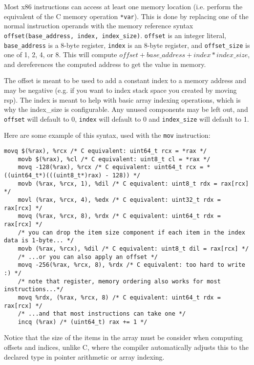 \documentclass[11pt]{article}
\begin{document}
Most x86 instructions can access at least one memory location (i.e. perform the equivalent
of the C memory operation \texttt{*var}). This is done by replacing one of the normal
instruction operands with the memory reference syntax \texttt{offset(base\_address,
index, index\_size)}. \texttt{offset} is an integer literal, \texttt{base\_address} is a
8-byte register, \texttt{index} is an 8-byte register, and \texttt{offset\_size} is one of
1, 2, 4, or 8. This will compute $offset + base\_address + index * index\_size$, and
dereferences the computed address to get the value in memory.

The offset is meant to be used to add a constant index to a memory address and may be
negative (e.g. if you want to index stack space you created by moving rsp). The index is
meant to help with basic array indexing operations, which is why the index\_size is
configurable. Any unused components may be left out, and \texttt{offset} will default to
0, \texttt{index} will default to 0 and \texttt{index\_size} will default to 1.

Here are some example of this syntax, used with the \texttt{mov} instruction:

\begin{lstlisting}[caption={Accessing memory references}, captionpos=b]
    movq $(%rax), %rcx /* C equivalent: uint64_t rcx = *rax */
    movb $(%rax), %cl /* C equivalent: uint8_t cl = *rax */
    movq -128(%rax), %rcx /* C equivalent: uint64_t rcx = *((uint64_t*)(((uint8_t*)rax) - 128)) */
    movb (%rax, %rcx, 1), %dil /* C equivalent: uint8_t rdx = rax[rcx] */
    movl (%rax, %rcx, 4), %edx /* C equivalent: uint32_t rdx = rax[rcx] */
    movq (%rax, %rcx, 8), %rdx /* C equivalent: uint64_t rdx = rax[rcx] */
    /* you can drop the item size component if each item in the index data is 1-byte... */
    movb (%rax, %rcx), %dil /* C equivalent: uint8_t dil = rax[rcx] */
    /* ...or you can also apply an offset */
    movq -256(%rax, %rcx, 8), %rdx /* C equivalent: too hard to write :) */
    /* note that register, memory ordering also works for most instructions...*/
    movq %rdx, (%rax, %rcx, 8) /* C equivalent: uint64_t rdx = rax[rcx] */
    /* ...and that most instructions can take one */
    incq (%rax) /* (uint64_t) rax += 1 */
\end{lstlisting}

Notice that the size of the items in the array must be consider when computing offsets
and indices, unlike C, where the compiler automatically adjusts this to the declared type
in pointer arithmetic or array indexing.
\end{document}
